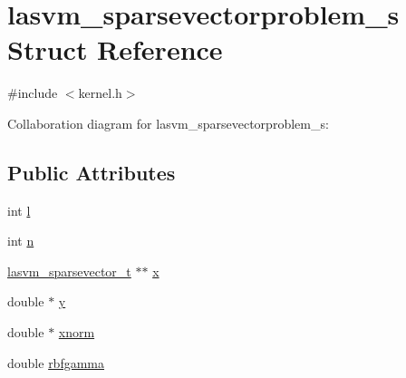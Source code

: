 \hypertarget{structlasvm__sparsevectorproblem__s}{\section{lasvm\+\_\+sparsevectorproblem\+\_\+s Struct Reference}
\label{structlasvm__sparsevectorproblem__s}
}


{\ttfamily \#include $<$kernel.\+h$>$}



Collaboration diagram for lasvm\+\_\+sparsevectorproblem\+\_\+s\+:
\subsection*{Public Attributes}
\begin{DoxyCompactItemize}
\item 
int \hyperlink{structlasvm__sparsevectorproblem__s_a0409f7771e82c142b4880c7fdb69a7a5}{l}
\item 
int \hyperlink{structlasvm__sparsevectorproblem__s_aceae2f92d2c8e412390f69c5bfeb2371}{n}
\item 
\hyperlink{vector_8h_a21bb9db0a03143d7719d45995d3b2eea}{lasvm\+\_\+sparsevector\+\_\+t} $\ast$$\ast$ \hyperlink{structlasvm__sparsevectorproblem__s_a8d0cb897b080699c427448abf38a1256}{x}
\item 
double $\ast$ \hyperlink{structlasvm__sparsevectorproblem__s_a58950a1217352677e5148864c3aa9075}{y}
\item 
double $\ast$ \hyperlink{structlasvm__sparsevectorproblem__s_ab037c4f1713cdb345d690b18f9fdac45}{xnorm}
\item 
double \hyperlink{structlasvm__sparsevectorproblem__s_a3d8114617a48411eba18fd76dfc373c4}{rbfgamma}
\end{DoxyCompactItemize}


